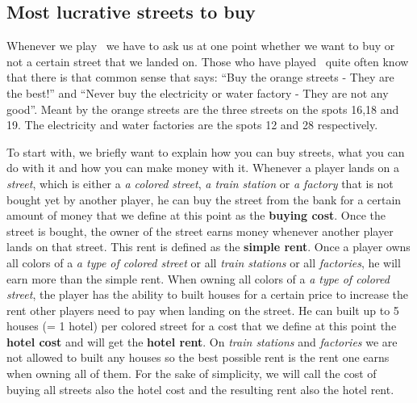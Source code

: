 
\subsection{Most lucrative streets to buy} %
\label{sub:most_lucrative_streets_to_buy}

Whenever we play \monopoly~we have to ask us at one point whether we want to buy or not a certain street 
that we landed on. Those who have played \monopoly~quite often know that there is that common sense that 
says: ``Buy the orange streets - They are the best!'' 
and ``Never buy the electricity or water factory - They are not any good''. 
Meant by the orange streets are the three streets on the spots 16,18 and 19. The electricity and water 
factories are the spots 12 and 28 respectively.

To start with, we briefly want to explain how you can buy streets, what you can do with it and how you can 
make money with it. Whenever a player lands on a \emph{street}, which is either a \emph{a colored street}, 
\emph{a train station} or \emph{a factory} that is not bought yet by another player, he can buy the street 
from the bank for a certain amount of money that we define at this point as the  \textbf{buying cost}.
Once the street is bought, the owner of the street earns money whenever another player lands on that street. 
This rent is defined as the \textbf{simple rent}. 
Once a player owns all colors of a \emph{a type of colored street} or all \emph{train stations} or all 
\emph{factories}, he will earn more than the simple rent. When owning all colors of a \emph{a type 
of colored street}, the player has the ability to built houses for a certain price to increase the rent other 
players need to pay when landing on the street. He can built up to 5 houses (= 1 hotel) per colored street 
for a cost that we define at this point the \textbf{hotel cost} and will get the \textbf{hotel rent}.
On \emph{train stations} and \emph{factories} we are not allowed to built any houses so the best possible 
rent is the rent one earns when owning all of them. For the sake of simplicity, we will call the cost of 
buying all streets also the hotel cost and the resulting rent also the hotel rent.

